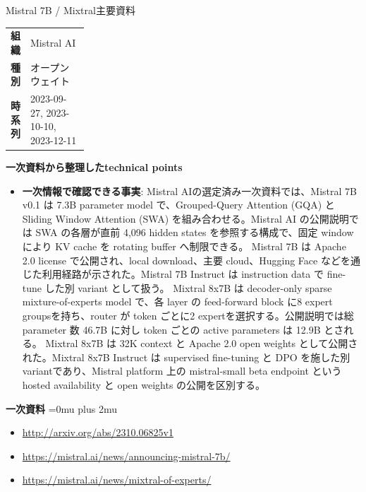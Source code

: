 \begin{technicalnote}{Mistral 7B / Mixtral}{主要資料}
\begingroup
\begin{tabularx}{\linewidth}{@{}>{\bfseries}p{0.22\linewidth}X@{}}
組織 & Mistral AI \\
種別 & オープンウェイト \\
時系列 & 2023-09-27, 2023-10-10, 2023-12-11 \\
\end{tabularx}
\smallskip
{\bfseries 一次資料から整理したtechnical points}
\begin{itemize}[leftmargin=1.5em,itemsep=0.35em]
\item \textbf{一次情報で確認できる事実}: Mistral AIの選定済み一次資料では、Mistral 7B v0.1 は 7.3B parameter model で、Grouped-Query Attention (GQA) と Sliding Window Attention (SWA) を組み合わせる。Mistral AI の公開説明では SWA の各層が直前 4,096 hidden states を参照する構成で、固定 window により KV cache を rotating buffer へ制限できる。 Mistral 7B は Apache 2.0 license で公開され、local download、主要 cloud、Hugging Face などを通じた利用経路が示された。Mistral 7B Instruct は instruction data で fine-tune した別 variant として扱う。 Mixtral 8x7B は decoder-only sparse mixture-of-experts model で、各 layer の feed-forward block に8 expert groupsを持ち、router が token ごとに2 expertを選択する。公開説明では総 parameter 数 46.7B に対し token ごとの active parameters は 12.9B とされる。 Mixtral 8x7B は 32K context と Apache 2.0 open weights として公開された。Mixtral 8x7B Instruct は supervised fine-tuning と DPO を施した別 variantであり、Mistral platform 上の mistral-small beta endpoint という hosted availability と open weights の公開を区別する。
\end{itemize}
\begin{minipage}{\linewidth}
\begin{samepage}
{\bfseries 一次資料}
\begingroup\sloppy
\Urlmuskip=0mu plus 2mu\relax
\begin{itemize}[leftmargin=1.5em,itemsep=0.25em]
\item {\scriptsize\url{http://arxiv.org/abs/2310.06825v1}}
\item {\scriptsize\url{https://mistral.ai/news/announcing-mistral-7b/}}
\item {\scriptsize\url{https://mistral.ai/news/mixtral-of-experts/}}
\end{itemize}
\endgroup
\end{samepage}
\end{minipage}
\endgroup
\end{technicalnote}
\medskip

